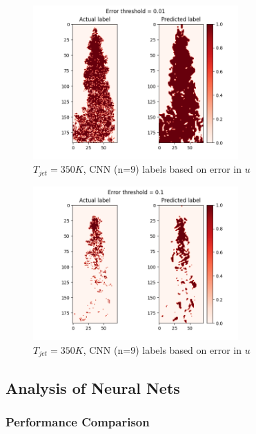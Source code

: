 \documentclass{article}
\begin{document}
\begin{figure}
    \centering
    \includegraphics[width=0.7\textwidth]{figures/labeleps2.png}
    \caption{$T_{jet} = 350K$, CNN (n=9) labels based on error in $u$}
\end{figure}
\begin{figure}
	\centering
	\includegraphics[width=0.7\textwidth]{figures/labeleps1.png}
	\caption{$T_{jet} = 350 K$, CNN (n=9) labels based on error in $u$}
\end{figure}

\subsection{Analysis of Neural Nets}

\subsubsection{Performance Comparison}
\end{document}
